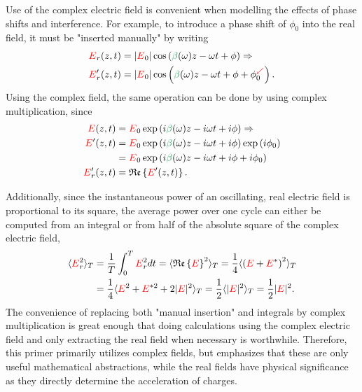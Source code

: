 Use of the complex electric field is convenient when modelling the effects of phase shifts and interference. For example, to introduce a phase shift of $\phi_0$ into the real field, it must be "inserted manually" by writing
\begin{align}
\label{eq:insert_phase}
    \E_r(z,t) &= |\E_0|\cos\left(\betag(\omega)z-\omega t+\phi\right) \Rightarrow \\ \nonumber \E_r'(z,t) &= |\E_0|\cos\left(\betag(\omega)z-\omega t+\phi+\phi_0^{\textcolor{Red}{\swarrow}}\right).   
\end{align}
Using the complex field, the same operation can be done by using complex multiplication, since
\begin{align}
\label{eq:insert_phase_complex}
    \E(z,t) &=\E_0 \exp\left( i\betag(\omega)z-i\omega t+ i\phi\right)\Rightarrow \\ \nonumber \E'(z,t) &=  \E_0 \exp\left( i\betag(\omega)z-i\omega t +i\phi\right)\exp\left( i\phi_0\right) \\ \nonumber
    &=\E_0 \exp\left( i\betag(\omega)z-i\omega t +i\phi+ i\phi_0\right) \\ \nonumber
    \E_r'(z,t) &= \real\left\{  \E'(z,t)   \right\}. 
\end{align}

Additionally, since the instantaneous power of an oscillating, real electric field is proportional to its square, the average power over one cycle can either be computed from an integral or from half of the absolute square of the complex electric field,
\begin{align}
\label{eq:average_power}
    \langle \textcolor{red}{E}_r^2 \rangle_T&= \frac{1}{T}\int_{0}^{T} \textcolor{red}{E}_r^2 dt = \langle\mathfrak{Re}\left\{\textcolor{red}{E}\right\}^2\rangle_T =\frac{1}{4}\langle\left(\textcolor{red}{E}+\textcolor{red}{E}^*\right)^2\rangle_T\\ \nonumber
&=\frac{1}{4}\langle \textcolor{red}{E}^2+\textcolor{red}{E}^{*2}+2|\textcolor{red}{E}|^2 \rangle_T=\frac{1}{2} \langle|\textcolor{red}{E}|^2\rangle_T=\frac{1}{2}|\textcolor{red}{E}|^2.
\end{align}
The convenience of replacing both "manual insertion" and integrals by complex multiplication is great enough that doing calculations using the complex electric field and only extracting the real field when necessary is worthwhile. Therefore, this primer primarily utilizes complex fields, but emphasizes that these are only useful mathematical abstractions, while the real fields have physical significance as they directly determine the acceleration of charges.  


